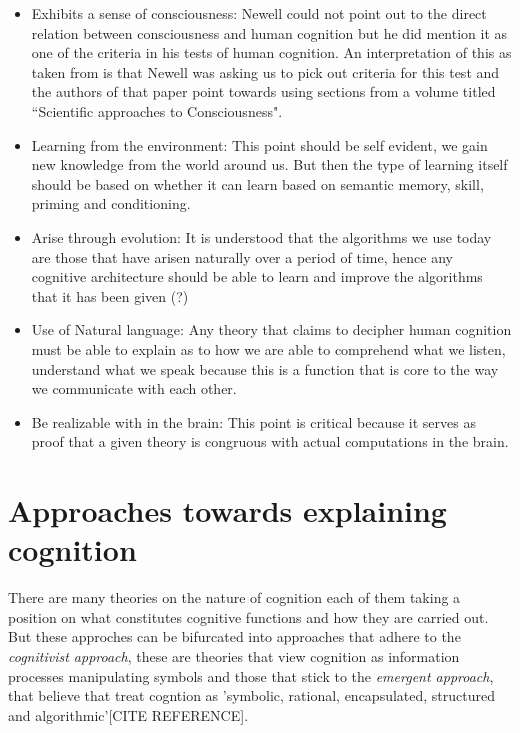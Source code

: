 \begin{itemize}
\item Exhibits a sense of consciousness: Newell could not
point out to the direct relation between consciousness and human
cognition but he did mention it as one of the criteria in his tests of
human cognition. An interpretation of this as taken from
\cite{CambridgeJournals:207162} is that Newell was asking us to pick
out criteria for this test and the authors of that paper point towards
using sections from a volume titled ``Scientific approaches to
Consciousness".

\item Learning from the environment: This point should be self
evident, we gain new knowledge from the world around us. But then
the type of learning itself should be based on whether it can learn based on
semantic memory, skill, priming and conditioning.

\item Arise through evolution: It is understood that the algorithms we
use today are those that have arisen naturally over a period of time,
hence any cognitive architecture should be able to learn and improve
the algorithms that it has been given (?)

\item Use of Natural language: Any theory that claims to decipher human
cognition must be able to explain as to how we are able to comprehend
what we listen, understand what we speak because this is a function
that is core to the way we communicate with each other.

\item Be realizable with in the brain: This point is critical because
it serves as proof that a given theory is congruous with actual
computations in the brain.
\end{itemize}
\section{Approaches towards explaining cognition}
    There are many theories on the nature of cognition each of them
    taking a position on what constitutes cognitive functions and how
    they are carried out. But these approches can be bifurcated into
    approaches that adhere to the \emph{cognitivist
    approach}\cite{DBLP:journals/tec/VernonMS07}, these are theories
    that view cognition as information processes manipulating symbols
    and those that stick to the \emph{emergent approach}, that believe
    that treat cogntion as 'symbolic, rational, encapsulated,
    structured and algorithmic'[CITE REFERENCE].
    

